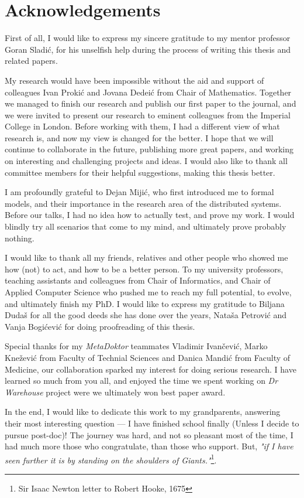 \chapter*{Acknowledgements}
First of all, I would like to express my sincere gratitude to my mentor professor Goran Sladi\'c, for his unselfish help during the process of writing this thesis and related papers.

My research would have been impossible without the aid and support of colleagues Ivan Proki\'c and Jovana Dedei\'c from Chair of Mathematics. Together we managed to finish our research and publish our first paper to the journal, and we were invited to present our research to eminent colleagues from the Imperial College in London. Before working with them, I had a different view of what research is, and now my view is changed for the better. I hope that we will continue to collaborate in the future, publishing more great papers, and working on interesting and challenging projects and ideas. I would also like to thank all committee members for their helpful suggestions, making this thesis better.

I am profoundly grateful to Dejan Miji\'c, who first introduced me to formal models, and their importance in the research area of the distributed systems. Before our talks, I had no idea how to actually test, and prove my work. I would blindly try all scenarios that come to my mind, and ultimately prove probably nothing.

I would like to thank all my friends, relatives and other people who showed me how (not) to act, and how to be a better person. To my university professors, teaching assistants and colleagues from Chair of Informatics, and Chair of Applied Computer Science who pushed me to reach my full potential, to evolve, and ultimately finish my PhD. I would like to express my gratitude to Biljana Duda\v s for all the good deeds she has done over the years, Nata\v sa Petrovi\'c and Vanja Bogi\'cevi\'c for doing proofreading of this thesis. 

Special thanks for my \emph{MetaDoktor} teammates Vladimir Ivan\v cevi\'c, Marko Kne\v zevi\'c from Faculty of Technial Sciences and Danica Mandi\'c from Faculty of Medicine, our collaboration sparked my interest for doing serious research. I have learned so much from you all, and enjoyed the time we spent working on \emph{Dr Warehouse} project were we ultimately won best paper award.

In the end, I would like to dedicate this work to my grandparents, answering their most interesting question --- I have finished school finally (Unless I decide to pursue post-doc)! The journey was hard, and not so pleasant most of the time, I had much more those who congratulate, than those who support. But, \emph{"if I have seen further it is by standing on the shoulders of Giants."}\footnote{Sir Isaac Newton letter to Robert Hooke, 1675}.